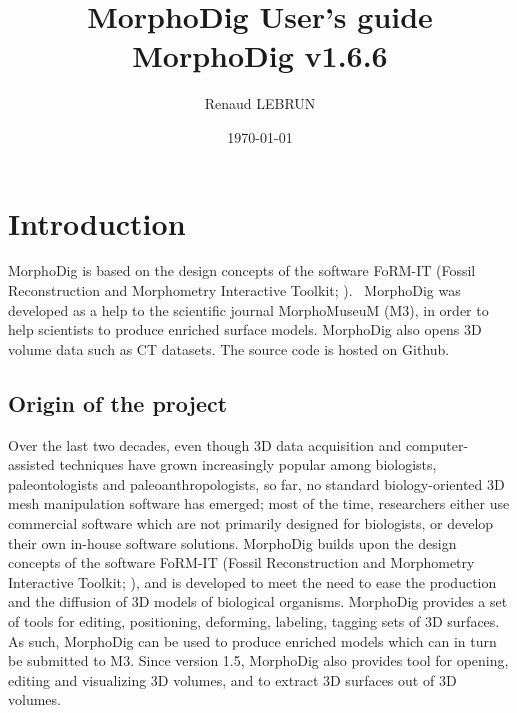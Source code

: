 \documentclass[12pt, a4paper]{book}
\title{MorphoDig User's guide\\MorphoDig v1.6.6}
\author{Renaud LEBRUN}
\affil{Institut des Sciences de l'Evolution de Montpellier, France}
\affil{Montpellier Ressources Imagerie platform}
\affil{CNRS}
\affil{Université de Montpellier}
\date{\today}
\begin{document}
	\dominitoc

\maketitle


\tableofcontents

\chapter*{Introduction}


\minitoc 

 MorphoDig is based on the design concepts of the software FoRM-IT (Fossil Reconstruction and Morphometry Interactive Toolkit; \citep{Zollikofer1995,Zollikofer2005}).
\ MorphoDig\citep{Lebrun2018} was developed as a help to the scientific journal MorphoMuseuM (M3), in order to help scientists to produce enriched surface models.  MorphoDig also opens 3D volume data such as CT datasets. The source code is hosted on Github.   
\section*{Origin of the project}
Over the last two decades, even though 3D data acquisition and computer-assisted techniques have grown increasingly popular among biologists, paleontologists and paleoanthropologists, so far, no standard biology-oriented 3D mesh manipulation software has emerged; most of the time, researchers either use commercial software which are not primarily designed for biologists, or develop their own in-house software solutions.  MorphoDig builds upon the design concepts of the software FoRM-IT (Fossil Reconstruction and Morphometry Interactive Toolkit; \citep{Zollikofer1995,Zollikofer2005}), and is developed to meet the need to ease the production and the diffusion of 3D models of biological organisms. MorphoDig provides a set of tools for editing, positioning, deforming, labeling, tagging sets of 3D surfaces.  As such, MorphoDig can be used to produce enriched models which can in turn be submitted to M3. Since version 1.5, MorphoDig also provides tool for opening, editing and visualizing 3D volumes, and to extract 3D surfaces out of 3D volumes. 
\end{document}
